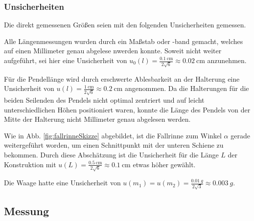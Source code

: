 	\subsubsection*{Unsicherheiten}
	Die direkt gemessenen Größen seien mit den folgenden Unsicherheiten gemessen.
	
	Alle Längenmessungen wurden durch ein Maßstab oder -band gemacht, welches auf einen Millimeter genau abgelese nwerden konnte.
	Soweit nicht weiter aufgeführt, sei hier eine Unsicherheit von $u_0(l) = \frac{\SI{0,1}{\centi\meter}}{2\sqrt{6}} \approx \SI{0,02}{\centi\meter}$ anzunehmen.
	
	Für die Pendellänge wird durch erschwerte Ablesbarkeit an der Halterung eine Unsicherheit von $u(l) = \frac{\SI{1}{\centi\meter}}{2\sqrt{6}} \approx \SI{0,2}{\centi\meter}$ angenommen.
	Da die Halterungen für die beiden Seilenden des Pendels nicht optimal zentriert und auf leicht unterschiedlichen Höhen positioniert waren, konnte die Länge des Pendels von der Mitte der Halterung nicht Millimeter genau abgelesen werden.
	
 	Wie in Abb. \ref{fig:fallrinneSkizze} abgebildet, ist die Fallrinne zum Winkel $\alpha$ gerade weitergeführt worden, um einen Schnittpunkt mit der unteren Schiene zu bekommen.
	Durch diese Abschätzung ist die Unsicherheit für die Länge $L$ der Konstruktion mit $u(L) = \frac{\SI{0,5}{\centi\meter}}{2\sqrt{6}} \approx \SI{0,1}{\centi\meter}$ etwas höher gewählt.
	
	Die Waage hatte eine Unsicherheit von $u(m_1) = u(m_2) = \frac{\SI{0,01}{g}}{2\sqrt{3}} \approx \SI{0,003}{g}$.
	
	\subsection{Messung}
	
